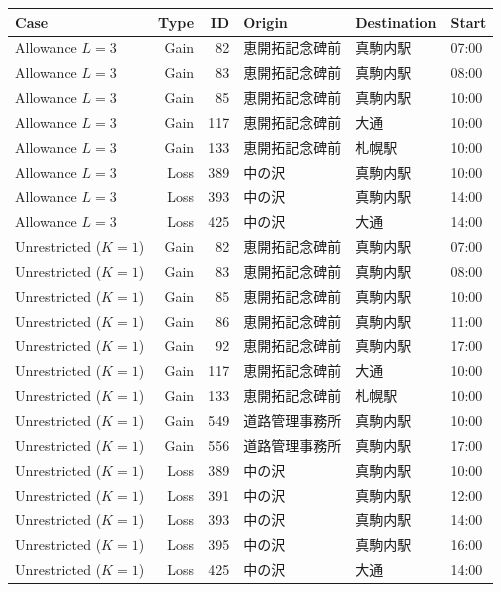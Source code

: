 \documentclass[10pt]{article}
\begin{document}
\begin{longtable}{@{}p{2.9cm}rrp{3.65cm}p{3.5cm}p{1.1cm}@{}}
\toprule Case & Type & ID & Origin & Destination & Start\\\midrule
\endhead
Allowance $L=3$ & Gain & 82 & 恵開拓記念碑前 & 真駒内駅 & 07:00 \\
Allowance $L=3$ & Gain & 83 & 恵開拓記念碑前 & 真駒内駅 & 08:00 \\
Allowance $L=3$ & Gain & 85 & 恵開拓記念碑前 & 真駒内駅 & 10:00 \\
Allowance $L=3$ & Gain & 117 & 恵開拓記念碑前 & 大通 & 10:00 \\
Allowance $L=3$ & Gain & 133 & 恵開拓記念碑前 & 札幌駅 & 10:00 \\
Allowance $L=3$ & Loss & 389 & 中の沢 & 真駒内駅 & 10:00 \\
Allowance $L=3$ & Loss & 393 & 中の沢 & 真駒内駅 & 14:00 \\
Allowance $L=3$ & Loss & 425 & 中の沢 & 大通 & 14:00 \\
Unrestricted ($K=1$) & Gain & 82 & 恵開拓記念碑前 & 真駒内駅 & 07:00 \\
Unrestricted ($K=1$) & Gain & 83 & 恵開拓記念碑前 & 真駒内駅 & 08:00 \\
Unrestricted ($K=1$) & Gain & 85 & 恵開拓記念碑前 & 真駒内駅 & 10:00 \\
Unrestricted ($K=1$) & Gain & 86 & 恵開拓記念碑前 & 真駒内駅 & 11:00 \\
Unrestricted ($K=1$) & Gain & 92 & 恵開拓記念碑前 & 真駒内駅 & 17:00 \\
Unrestricted ($K=1$) & Gain & 117 & 恵開拓記念碑前 & 大通 & 10:00 \\
Unrestricted ($K=1$) & Gain & 133 & 恵開拓記念碑前 & 札幌駅 & 10:00 \\
Unrestricted ($K=1$) & Gain & 549 & 道路管理事務所 & 真駒内駅 & 10:00 \\
Unrestricted ($K=1$) & Gain & 556 & 道路管理事務所 & 真駒内駅 & 17:00 \\
Unrestricted ($K=1$) & Loss & 389 & 中の沢 & 真駒内駅 & 10:00 \\
Unrestricted ($K=1$) & Loss & 391 & 中の沢 & 真駒内駅 & 12:00 \\
Unrestricted ($K=1$) & Loss & 393 & 中の沢 & 真駒内駅 & 14:00 \\
Unrestricted ($K=1$) & Loss & 395 & 中の沢 & 真駒内駅 & 16:00 \\
Unrestricted ($K=1$) & Loss & 425 & 中の沢 & 大通 & 14:00 \\
\bottomrule\end{longtable}
\end{document}
